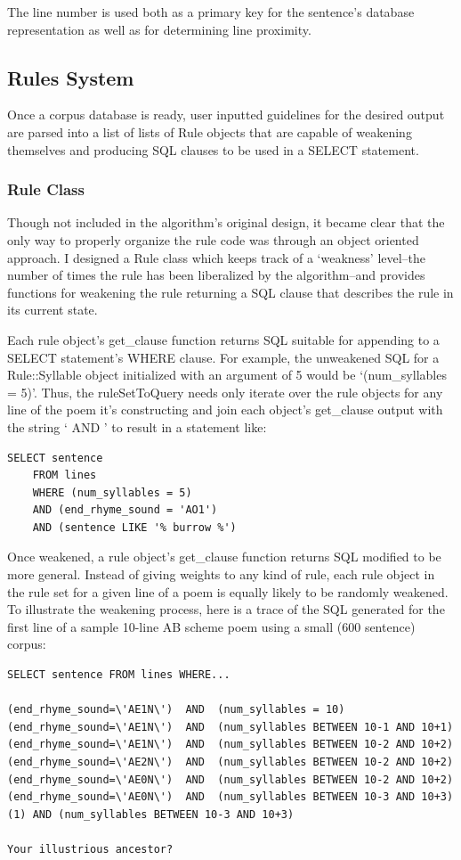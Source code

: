 \documentclass[10pt]{article}
\begin{document}
The line number is used both as a primary key for the sentence's database
representation as well as for determining line proximity.

\subsection{Rules System}
Once a corpus database is ready, user inputted guidelines for the desired
output are parsed into a list of lists of Rule objects that are capable of
weakening themselves and producing SQL clauses to be used in a SELECT
statement.

\subsubsection{Rule Class}
Though not included in the algorithm's original design, it became clear that
the only way to properly organize the rule code was through an object oriented
approach. I designed a Rule class which keeps track of a `weakness' level--the
number of times the rule has been liberalized by the algorithm--and provides
functions for weakening the rule returning a SQL clause that describes the rule
in its current state.

Each rule object's get\_clause function returns SQL suitable for appending to a
SELECT statement's WHERE clause. For example, the unweakened SQL for a
Rule::Syllable object initialized with an argument of 5 would be
`(num\_syllables = 5)'. Thus, the ruleSetToQuery needs only iterate over the
rule objects for any line of the poem it's constructing and join each object's
get\_clause output with the string ` AND ' to result in a statement like:

\begin{verbatim}
SELECT sentence 
    FROM lines 
    WHERE (num_syllables = 5) 
    AND (end_rhyme_sound = 'AO1') 
    AND (sentence LIKE '% burrow %')
\end{verbatim}

Once weakened, a rule object's get\_clause function returns SQL modified to be
more general. Instead of giving weights to any kind of rule, each rule object
in the rule set for a given line of a poem is equally likely to be randomly
weakened. To illustrate the weakening process, here is a trace of the SQL
generated for the first line of a sample 10-line AB scheme poem using a small (600
sentence) corpus:

\begin{verbatim}
SELECT sentence FROM lines WHERE...

(end_rhyme_sound=\'AE1N\')  AND  (num_syllables = 10)
(end_rhyme_sound=\'AE1N\')  AND  (num_syllables BETWEEN 10-1 AND 10+1)
(end_rhyme_sound=\'AE1N\')  AND  (num_syllables BETWEEN 10-2 AND 10+2)
(end_rhyme_sound=\'AE2N\')  AND  (num_syllables BETWEEN 10-2 AND 10+2)
(end_rhyme_sound=\'AE0N\')  AND  (num_syllables BETWEEN 10-2 AND 10+2)
(end_rhyme_sound=\'AE0N\')  AND  (num_syllables BETWEEN 10-3 AND 10+3)
(1) AND (num_syllables BETWEEN 10-3 AND 10+3)

Your illustrious ancestor?
\end{verbatim}
\end{document}
